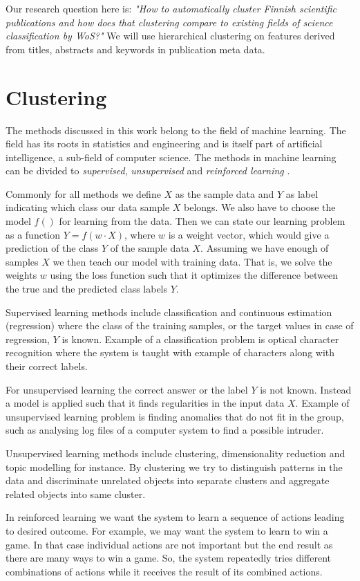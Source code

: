 Our research question here is: \emph{"How to automatically cluster 
Finnish scientific publications and how does that clustering 
compare to existing fields of science classification by WoS?"} We 
will use hierarchical clustering on features derived from titles,
abstracts and keywords in publication meta data.


\section{Clustering}
The methods discussed in this work belong to the field of machine 
learning. The field has its roots in statistics and engineering 
and is itself part of artificial intelligence, a sub-field of 
computer science.
The methods in machine learning can be divided to \emph{supervised}, 
\emph{unsupervised} and \emph{reinforced learning}
\cite{alpaydin2004introduction}.

Commonly for all methods we define $X$ as
the sample data and $Y$ as label indicating which class our data 
sample $X$ belongs. We also have to choose the model $f()$ for
learning from the data. Then we can state our learning problem as
a function $Y = f(w \cdot X)$, where $w$ is a weight vector, 
which would give a prediction of the class $Y$ of the sample data
$X$. 
Assuming we have enough of samples $X$ we then teach our model 
with training data. That is, we solve the weights $w$ using the
loss function such that it optimizes the difference between the 
true and the predicted class labels $Y$.

Supervised learning methods include classification and continuous 
estimation (regression)
where the class of the training samples, or the target values in 
case of regression, $Y$ is known. Example of a classification 
problem is optical character recognition where the system is 
taught with example of characters along with their correct labels.

For unsupervised learning the correct answer or the label $Y$ is not known. 
Instead a model is applied such that it finds regularities in the
input data $X$. Example of unsupervised learning problem is 
finding anomalies that do not fit in the group, such as analysing
log files of a computer system to find a possible intruder.

Unsupervised learning methods include clustering, dimensionality
reduction and topic modelling for instance. By clustering we try to 
distinguish patterns in the data and discriminate unrelated 
objects into separate clusters and aggregate related objects into
same cluster.

In reinforced learning we want the system to learn a sequence of
actions leading to desired outcome. For example, we may want the 
system to learn to win a game. In that case individual actions
are not important but the end result as there are many ways to win
a game. So, the system repeatedly tries different combinations of
actions while it receives the result of its combined actions.


